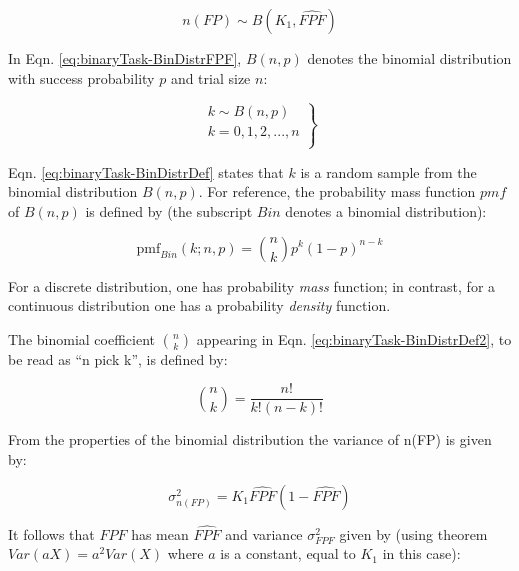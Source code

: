 \documentclass[
]{book}
\begin{document}
\begin{equation} 
n(FP) \sim B\left ( K_1, \widehat{FPF} \right )
\label{eq:binaryTask-BinDistrFPF}
\end{equation}

In Eqn. \eqref{eq:binaryTask-BinDistrFPF}, \(B(n,p)\) denotes the binomial distribution with success probability \(p\) and trial size \(n\):

\begin{equation} 
\left.\begin{matrix}
k \sim B\left ( n, p \right )\\
k=0,1,2,...,n\\
\end{matrix}\right\}
\label{eq:binaryTask-BinDistrDef}
\end{equation}

Eqn. \eqref{eq:binaryTask-BinDistrDef} states that \(k\) is a random sample from the binomial distribution \(B(n,p)\). For reference, the probability mass function \(pmf\) of \(B(n,p)\) is defined by (the subscript \(Bin\) denotes a binomial distribution):

\begin{equation} 
\text{pmf}_{Bin}\left ( k;n,p \right )=\binom{n}{k}p^k(1-p)^{n-k}
\label{eq:binaryTask-BinDistrDef2}
\end{equation}

For a discrete distribution, one has probability \emph{mass} function; in contrast, for a continuous distribution one has a probability \emph{density} function.

The binomial coefficient \(\binom{n}{k}\) appearing in Eqn. \eqref{eq:binaryTask-BinDistrDef2}, to be read as ``n pick k'', is defined by:

\begin{equation} 
\binom{n}{k}=\frac{n!}{k!(n-k)!}
\label{eq:binaryTask-BinCoeff}
\end{equation}

From the properties of the binomial distribution the variance of n(FP) is given by:

\begin{equation} 
\sigma_{n(FP)}^2=K_1\widehat{FPF}\left ( 1 - \widehat{FPF} \right )
\label{eq:binaryTask-Var-n-FP}
\end{equation}

It follows that \(FPF\) has mean \(\widehat{FPF}\) and variance \(\sigma_{FPF}^2\) given by (using theorem \(Var(aX) = a^2 Var(X)\) where \(a\) is a constant, equal to \(K_1\) in this case):
\end{document}
